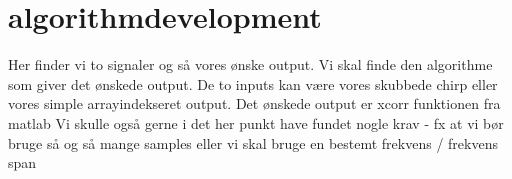 \chapter{algorithmdevelopment}
Her finder vi to signaler og så vores ønske output. Vi skal finde den algorithme som giver det ønskede output. De to inputs kan være vores skubbede chirp eller vores simple arrayindekseret output. Det ønskede output er xcorr funktionen fra matlab
Vi skulle også gerne i det her punkt have fundet nogle krav - fx at vi bør bruge så og så mange samples eller vi skal bruge en bestemt frekvens / frekvens span